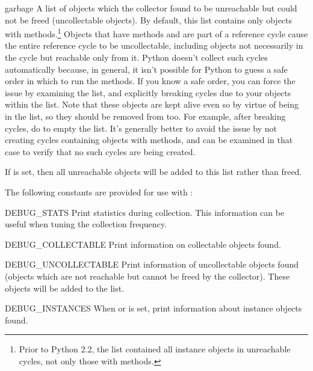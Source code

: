 \begin{datadesc}{garbage}
A list of objects which the collector found to be unreachable
but could not be freed (uncollectable objects).  By default, this list
contains only objects with  methods.\footnote{Prior to
  Python 2.2, the list contained all instance objects in unreachable
  cycles,  not only those with  methods.}
Objects that have
 methods and are part of a reference cycle cause
the entire reference cycle to be uncollectable, including objects
not necessarily in the cycle but reachable only from it.  Python doesn't
collect such cycles automatically because, in general, it isn't possible
for Python to guess a safe order in which to run the 
methods.  If you know a safe order, you can force the issue by examining
the  list, and explicitly breaking cycles due to your
objects within the list.  Note that these objects are kept alive even
so by virtue of being in the  list, so they should be
removed from  too.  For example, after breaking cycles, do
 to empty the list.  It's generally better
to avoid the issue by not creating cycles containing objects with
 methods, and  can be examined in that
case to verify that no such cycles are being created.

If  is set, then all unreachable objects will
be added to this list rather than freed.
\end{datadesc}


The following constants are provided for use with
:

\begin{datadesc}{DEBUG_STATS}
Print statistics during collection.  This information can
be useful when tuning the collection frequency.
\end{datadesc}

\begin{datadesc}{DEBUG_COLLECTABLE}
Print information on collectable objects found.
\end{datadesc}

\begin{datadesc}{DEBUG_UNCOLLECTABLE}
Print information of uncollectable objects found (objects which are
not reachable but cannot be freed by the collector).  These objects
will be added to the  list.
\end{datadesc}

\begin{datadesc}{DEBUG_INSTANCES}
When  or  is
set, print information about instance objects found.
\end{datadesc}

